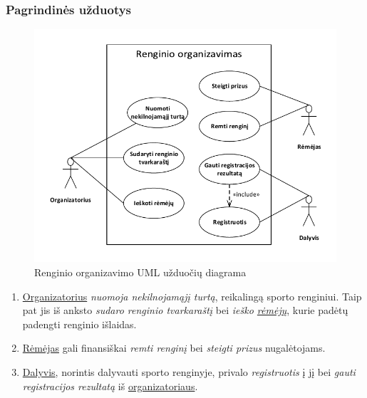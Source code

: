 \documentclass{VUMIFPSkursinis}
\begin{document}
    \subsubsection*{Pagrindinės užduotys} \label{vidineVersloProcesoAnalize_uzduotys_pagrindinesUzduotys}
        \begin{figure}[H]
          \centering
          \includegraphics[width=\textwidth]{img/UzduociuDiagrama1}
          \caption{Renginio organizavimo UML užduočių diagrama}
          \label{fig:organizavimoUzduociuDiagrama}
        \end{figure}

        \begin{enumerate}
          \item \underline{Organizatorius} \textit{nuomoja nekilnojamąjį turtą}, reikalingą sporto renginiui. Taip pat jis iš anksto \textit{sudaro renginio tvarkaraštį} bei
                \textit{ieško \underline{rėmėjų}}, kurie padėtų padengti renginio išlaidas.
          \item \underline{Rėmėjas} gali finansiškai \textit{remti renginį} bei \textit{steigti prizus} nugalėtojams.
          \item \underline{Dalyvis}, norintis dalyvauti sporto renginyje, privalo \textit{registruotis} į jį bei \textit{gauti registracijos rezultatą} iš \underline{organizatoriaus}.
        \end{enumerate}
\end{document}
